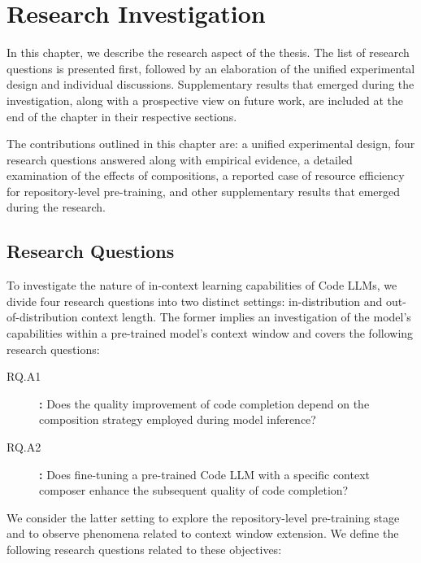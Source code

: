 \chapter{Research Investigation}\label{chap:research-investigation}

In this chapter, we describe the research aspect of the thesis. The list of research questions is presented first, followed by an elaboration of the unified experimental design and individual discussions. Supplementary results that emerged during the investigation, along with a prospective view on future work, are included at the end of the chapter in their respective sections. 

The contributions outlined in this chapter are: a unified experimental design, four research questions answered along with empirical evidence, a detailed examination of the effects of compositions, a reported case of resource efficiency for repository-level pre-training, and other supplementary results that emerged during the research.

\section{Research Questions}

To investigate the nature of in-context learning capabilities of Code LLMs, we divide four research questions into two distinct settings: in-distribution and out-of-distribution context length. The former implies an investigation of the model's capabilities within a pre-trained model's context window and covers the following research questions:

\begin{description}
    \item[RQ.A1]\label{rq:rq-a1} \textbf{:} Does the quality improvement of code completion depend on the composition strategy employed during model inference?
    \item[RQ.A2]\label{rq:rq-a2} \textbf{:} Does fine-tuning a pre-trained Code LLM with a specific context composer enhance the subsequent quality of code completion?
\end{description}

We consider the latter setting to explore the repository-level pre-training stage and to observe phenomena related to context window extension. We define the following research questions related to these objectives:

